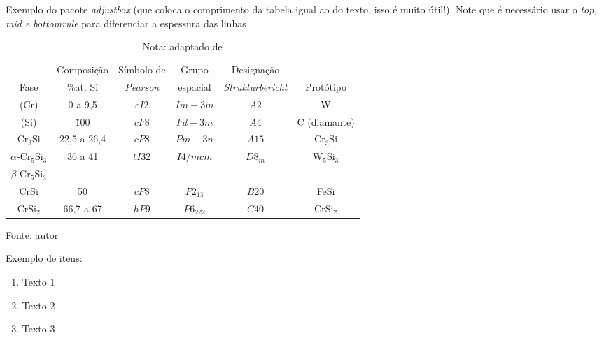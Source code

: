 \begin{table}
	\centering
	\caption{Exemplo do pacote \textit{adjustbox} (que coloca o comprimento da tabela igual ao do texto, isso é muito útil!). Note que é necessário usar o \textit{top, mid e bottomrule} para diferenciar a espessura das linhas}
	\begin{adjustbox}{max width=\textwidth}
		\begin{tabular}{c|ccccc}
			& Composição& Símbolo de &Grupo &Designação & \\
			Fase &\%at. Si & \textit{Pearson} &espacial &\textit{Strukturbericht} &Protótipo \\
			\toprule
			(Cr) & 0 a 9,5 & $cI2$ & $Im-3m$& $A2$&W\\
			\hline
			(Si) & \~ 100 & $cF8$ & $Fd-3m$ & $A4$ & C (diamante) \\ 
			\hline
			Cr$_3$Si & 22,5 a 26,4 & $cP8$ & $Pm-3n$ & $A15$ & Cr$_3$Si\\
			\hline
			$\alpha$-Cr$_5$Si$_3$ & 36 a 41 & $tI32$ & $I4/mcm$& $D8_m$ & W$_5$Si$_3$\\
			\hline
			$\beta$-Cr$_5$Si$_3$ & --- & --- & --- & --- & --- \\
			\hline
			CrSi & 50 & $cP8$ & $P2_13$ & $B20$ & FeSi\\
			\hline
			CrSi$_2$ & 66,7 a 67 & $hP9$ & $P6_222$ & $C40$ & CrSi$_2$\\
			\bottomrule
		\end{tabular}
	\end{adjustbox}
	\label{tab:estruturas-cristalinas-Cr--Si}
	\caption*{Fonte: autor}
	\caption*{Nota: adaptado de \cite{Gokhale1987}}
\end{table}

Exemplo de itens:

\begin{enumerate}
	\item Texto 1
	\item Texto 2
	\item Texto 3
\end{enumerate}

